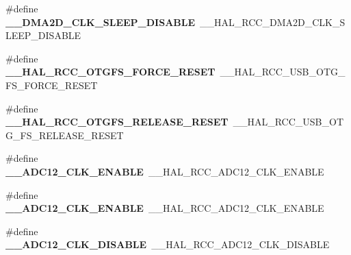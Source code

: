 \begin{DoxyCompactItemize}
\item 
\hypertarget{group___h_a_l___r_c_c___aliased_ga110cab59300981de86087cbc6469fc22}{\#define {\bfseries \-\_\-\-\_\-\-D\-M\-A2\-D\-\_\-\-C\-L\-K\-\_\-\-S\-L\-E\-E\-P\-\_\-\-D\-I\-S\-A\-B\-L\-E}~\-\_\-\-\_\-\-H\-A\-L\-\_\-\-R\-C\-C\-\_\-\-D\-M\-A2\-D\-\_\-\-C\-L\-K\-\_\-\-S\-L\-E\-E\-P\-\_\-\-D\-I\-S\-A\-B\-L\-E}\label{group___h_a_l___r_c_c___aliased_ga110cab59300981de86087cbc6469fc22}

\item 
\hypertarget{group___h_a_l___r_c_c___aliased_gabc6844528b432554fefc7643de9a9dd9}{\#define {\bfseries \-\_\-\-\_\-\-H\-A\-L\-\_\-\-R\-C\-C\-\_\-\-O\-T\-G\-F\-S\-\_\-\-F\-O\-R\-C\-E\-\_\-\-R\-E\-S\-E\-T}~\-\_\-\-\_\-\-H\-A\-L\-\_\-\-R\-C\-C\-\_\-\-U\-S\-B\-\_\-\-O\-T\-G\-\_\-\-F\-S\-\_\-\-F\-O\-R\-C\-E\-\_\-\-R\-E\-S\-E\-T}\label{group___h_a_l___r_c_c___aliased_gabc6844528b432554fefc7643de9a9dd9}

\item 
\hypertarget{group___h_a_l___r_c_c___aliased_gaaa8e6b2c2a37901c0312f877f5845c3d}{\#define {\bfseries \-\_\-\-\_\-\-H\-A\-L\-\_\-\-R\-C\-C\-\_\-\-O\-T\-G\-F\-S\-\_\-\-R\-E\-L\-E\-A\-S\-E\-\_\-\-R\-E\-S\-E\-T}~\-\_\-\-\_\-\-H\-A\-L\-\_\-\-R\-C\-C\-\_\-\-U\-S\-B\-\_\-\-O\-T\-G\-\_\-\-F\-S\-\_\-\-R\-E\-L\-E\-A\-S\-E\-\_\-\-R\-E\-S\-E\-T}\label{group___h_a_l___r_c_c___aliased_gaaa8e6b2c2a37901c0312f877f5845c3d}

\item 
\hypertarget{group___h_a_l___r_c_c___aliased_ga122c5ade42bf95733284ef8204a4506b}{\#define {\bfseries \-\_\-\-\_\-\-A\-D\-C12\-\_\-\-C\-L\-K\-\_\-\-E\-N\-A\-B\-L\-E}~\-\_\-\-\_\-\-H\-A\-L\-\_\-\-R\-C\-C\-\_\-\-A\-D\-C12\-\_\-\-C\-L\-K\-\_\-\-E\-N\-A\-B\-L\-E}\label{group___h_a_l___r_c_c___aliased_ga122c5ade42bf95733284ef8204a4506b}

\item 
\hypertarget{group___h_a_l___r_c_c___aliased_ga122c5ade42bf95733284ef8204a4506b}{\#define {\bfseries \-\_\-\-\_\-\-A\-D\-C12\-\_\-\-C\-L\-K\-\_\-\-E\-N\-A\-B\-L\-E}~\-\_\-\-\_\-\-H\-A\-L\-\_\-\-R\-C\-C\-\_\-\-A\-D\-C12\-\_\-\-C\-L\-K\-\_\-\-E\-N\-A\-B\-L\-E}\label{group___h_a_l___r_c_c___aliased_ga122c5ade42bf95733284ef8204a4506b}

\item 
\hypertarget{group___h_a_l___r_c_c___aliased_gabe7e11fce558e2053cdb0ae751126536}{\#define {\bfseries \-\_\-\-\_\-\-A\-D\-C12\-\_\-\-C\-L\-K\-\_\-\-D\-I\-S\-A\-B\-L\-E}~\-\_\-\-\_\-\-H\-A\-L\-\_\-\-R\-C\-C\-\_\-\-A\-D\-C12\-\_\-\-C\-L\-K\-\_\-\-D\-I\-S\-A\-B\-L\-E}\label{group___h_a_l___r_c_c___aliased_gabe7e11fce558e2053cdb0ae751126536}


\end{DoxyCompactItemize}
